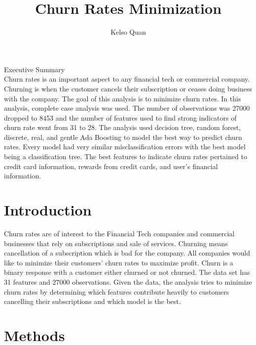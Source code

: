 \documentclass{article}\usepackage[]{graphicx}\usepackage[]{color}
\title{Churn Rates Minimization}
\author{Kelso Quan}
\begin{document}
 

\maketitle
\begin{center}
\vspace{10cm}
\large{Executive Summary} \\
\qquad Churn rates is an important aspect to any financial tech or commercial company. Churning is when the customer cancels their subscription or ceases doing business with the company. The goal of this analysis is to minimize churn rates. In this analysis, complete case analysis was used. The number of observations was 27000 dropped to 8453 and the number of features used to find strong indicators of churn rate went from 31 to 28. The analysis used decision tree, random forest, discrete, real, and gentle Ada Boosting to model the best way to predict churn rates. Every model had very similar misclassification errors with the best model being a classification tree. The best features to indicate churn rates pertained to credit card information, rewards from credit cards, and user's financial information. 
\end{center}
\newpage

\section{Introduction} 

\qquad Churn rates are of interest to the Financial Tech companies and commercial businesses that rely on subscriptions and sale of services. Churning means cancellation of a subscription which is bad for the company. All companies would like to minimize their customers' churn rates to maximize profit. Churn is a binary response with a customer either churned or not churned. The data set has 31 features and 27000 observations. Given the data, the analysis tries to minimize churn rates by determining which features contribute heavily to customers cancelling their subscriptions and which model is the best. \\

\section{Methods} 
\end{document}
